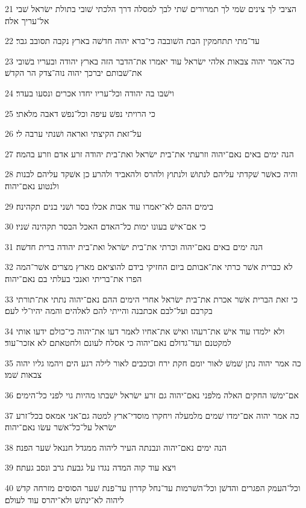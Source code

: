 \par 21 הציבי לך צינים שׂמי לך תמרורים שׁתי לבך למסלה דרך הלכתי שׁובי בתולת ישׂראל שׁבי אל־עריך אלה׃
\par 22 עד־מתי תתחמקין הבת השׁובבה כי־ברא יהוה חדשׁה בארץ נקבה תסובב גבר׃
\par 23 כה־אמר יהוה צבאות אלהי ישׂראל עוד יאמרו את־הדבר הזה בארץ יהודה ובעריו בשׁובי את־שׁבותם יברכך יהוה נוה־צדק הר הקדשׁ׃
\par 24 וישׁבו בה יהודה וכל־עריו יחדו אכרים ונסעו בעדר׃
\par 25 כי הרויתי נפשׁ עיפה וכל־נפשׁ דאבה מלאתי׃
\par 26 על־זאת הקיצתי ואראה ושׁנתי ערבה לי׃
\par 27 הנה ימים באים נאם־יהוה וזרעתי את־בית ישׂראל ואת־בית יהודה זרע אדם וזרע בהמה׃
\par 28 והיה כאשׁר שׁקדתי עליהם לנתושׁ ולנתוץ ולהרס ולהאביד ולהרע כן אשׁקד עליהם לבנות ולנטוע נאם־יהוה׃
\par 29 בימים ההם לא־יאמרו עוד אבות אכלו בסר ושׁני בנים תקהינה׃
\par 30 כי אם־אישׁ בעונו ימות כל־האדם האכל הבסר תקהינה שׁניו׃
\par 31 הנה ימים באים נאם־יהוה וכרתי את־בית ישׂראל ואת־בית יהודה ברית חדשׁה׃
\par 32 לא כברית אשׁר כרתי את־אבותם ביום החזיקי בידם להוציאם מארץ מצרים אשׁר־המה הפרו את־בריתי ואנכי בעלתי בם נאם־יהוה׃
\par 33 כי זאת הברית אשׁר אכרת את־בית ישׂראל אחרי הימים ההם נאם־יהוה נתתי את־תורתי בקרבם ועל־לבם אכתבנה והייתי להם לאלהים והמה יהיו־לי לעם׃
\par 34 ולא ילמדו עוד אישׁ את־רעהו ואישׁ את־אחיו לאמר דעו את־יהוה כי־כולם ידעו אותי למקטנם ועד־גדולם נאם־יהוה כי אסלח לעונם ולחטאתם לא אזכר־עוד׃
\par 35 כה אמר יהוה נתן שׁמשׁ לאור יומם חקת ירח וכוכבים לאור לילה רגע הים ויהמו גליו יהוה צבאות שׁמו׃
\par 36 אם־ימשׁו החקים האלה מלפני נאם־יהוה גם זרע ישׂראל ישׁבתו מהיות גוי לפני כל־הימים׃
\par 37 כה אמר יהוה אם־ימדו שׁמים מלמעלה ויחקרו מוסדי־ארץ למטה גם־אני אמאס בכל־זרע ישׂראל על־כל־אשׁר עשׂו נאם־יהוה׃
\par 38 הנה ימים נאם־יהוה ונבנתה העיר ליהוה ממגדל חננאל שׁער הפנה׃
\par 39 ויצא עוד קוה המדה נגדו על גבעת גרב ונסב געתה׃
\par 40 וכל־העמק הפגרים והדשׁן וכל־השׁרמות עד־נחל קדרון עד־פנת שׁער הסוסים מזרחה קדשׁ ליהוה לא־ינתשׁ ולא־יהרס עוד לעולם׃

